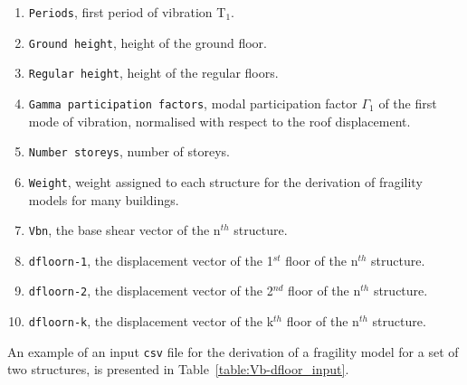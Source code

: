 \begin{enumerate}
\item \verb=Periods=, first period of vibration T$_1$.
\item \verb=Ground height=, height of the ground floor.
\item \verb=Regular height=, height of the regular floors.
\item \verb=Gamma participation factors=, modal participation factor $\Gamma_1$ of the first mode of vibration, normalised with respect to the roof displacement.
\item \verb=Number storeys=, number of storeys.
\item \verb=Weight=, weight assigned to each structure for the derivation of fragility models for many buildings.
\item \verb=Vbn=, the base shear vector of the n$^{th}$ structure.
\item \verb=dfloorn-1=, the displacement vector of the 1$^{st}$ floor of the n$^{th}$ structure.
\item \verb=dfloorn-2=, the displacement vector of the 2$^{nd}$ floor of the n$^{th}$ structure.
\item \verb=dfloorn-k=, the displacement vector of the k$^{th}$ floor of the n$^{th}$ structure. \\
\end{enumerate}

An example of an input \verb=csv= file for the derivation of a fragility model for a set of two structures, is presented in Table~\ref{table:Vb-dfloor_input}.

